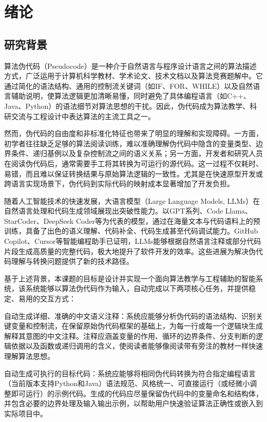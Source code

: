 \documentclass[twoside,openright]{xduugthesis}
\begin{document}
\chapter{绪论}

\section{研究背景}

算法伪代码（Pseudocode）是一种介于自然语言与程序设计语言之间的算法描述方式，广泛运用于计算机科学教材、学术论文、技术文档以及算法竞赛题解中。它通过简化的语法结构、通用的控制流关键词（如IF、FOR、WHILE）以及自然语言辅助说明，使算法逻辑更加清晰易懂，同时避免了具体编程语言（如C++、Java、Python）的语法细节对算法思想的干扰。因此，伪代码成为算法教学、科研交流与工程设计中表达算法的主流工具之一。

然而，伪代码的自由度和非标准化特征也带来了明显的理解和实现障碍。一方面，初学者往往缺乏足够的算法阅读训练，难以准确理解伪代码中隐含的变量类型、边界条件、递归基例以及复杂控制流之间的语义关系；另一方面，开发者和研究人员在阅读伪代码后，通常需要手工将其转换为可运行的源代码。这一过程不仅耗时、易错，而且难以保证转换结果与原始算法逻辑的一致性。尤其是在快速原型开发或跨语言实现场景下，伪代码到实际代码的映射成本显著增加了开发负担。

随着人工智能技术的快速发展，大语言模型（Large Language Models, LLMs）在自然语言处理和代码生成领域展现出突破性能力。以GPT系列、Code Llama、StarCoder、DeepSeek Coder等为代表的模型，通过在海量文本与代码语料上的预训练，具备了出色的语义理解、代码补全、代码生成甚至代码调试能力。GitHub Copilot、Cursor等智能编程助手已证明，LLMs能够根据自然语言注释或部分代码片段生成高质量的完整代码，极大地提升了软件开发的效率。这些进展为解决伪代码理解与转换问题提供了新的技术路径。

基于上述背景，本课题的目标是设计并实现一个面向算法教学与工程辅助的智能系统，该系统能够以算法伪代码作为输入，自动完成以下两项核心任务，并提供稳定、易用的交互方式：

自动生成详细、准确的中文语义注释：系统应能够分析伪代码的语法结构、识别关键变量和控制流，在保留原始伪代码框架的基础上，为每一行或每一个逻辑块生成解释其意图的中文注释。注释应涵盖变量的作用、循环的边界条件、分支判断的逻辑依据以及函数或递归调用的含义，使阅读者能够像阅读带有旁注的教材一样快速理解算法思想。

自动生成可执行的目标代码：系统应能够将相同伪代码转换为符合指定编程语言（当前版本支持Python和Java）语法规范、风格统一、可直接运行（或经微小调整即可运行）的示例代码。生成的代码应尽量保留伪代码中的变量命名和结构体，并包含必要的边界处理及输入输出示例，以帮助用户快速验证算法正确性或嵌入到实际项目中。
\end{document}
